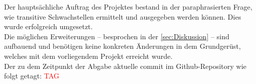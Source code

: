     Der hauptsächliche Auftrag des Projektes bestand in der paraphrasierten Frage, wie transitive Schwachstellen ermittelt und ausgegeben werden können.
    Dies wurde erfolgreich umgesetzt.
    \\
    Die möglichen Erweiterungen -- besprochen in der \ref{sec:Diskussion}  -- sind aufbauend und benötigen keine konkreten Änderungen in dem Grundgerüst, welches mit dem vorliegendem Projekt erreicht wurde.
    \\
    Der zu dem Zeitpunkt der Abgabe aktuelle commit im Github-Repository wie folgt getagt: \textcolor{red}{TAG}
